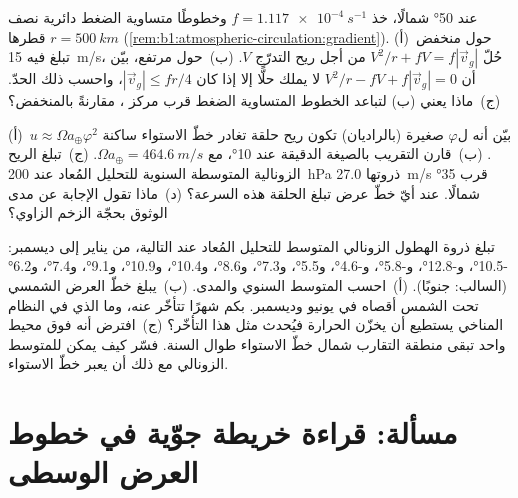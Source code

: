 \begin{exercise}[$\star\star\star$]\label{exo:b1:atmospheric-circulation:10}
عند \ang{50} شمالًا، خذ $f = \qty{1.117e-4}{s^{-1}}$ وخطوطًا متساوية الضغط دائرية نصف قطرها $r = \qty{500}{km}$ (\cref{rem:b1:atmospheric-circulation:gradient}). (أ)~حول منخفض تبلغ فيه  \qty{15}{m/s}، حُلّ $V^2/r + fV =
f|\vec v_g|$ من أجل ريح التدرّج $V$. (ب)~حول مرتفع، بيّن أن $V^2/r - fV + f
|\vec v_g| = 0$ لا يملك حلًّا إلا إذا كان $|\vec v_g| \leq fr/4$، واحسب ذلك الحدّ. (ج)~ماذا يعني (ب) لتباعد الخطوط المتساوية الضغط قرب مركز ، مقارنةً بالمنخفض؟
\end{exercise}

\begin{exercise}[$\star\star\star$]\label{exo:b1:atmospheric-circulation:11}
(أ)~بيّن أنه ل$\varphi$ صغيرة (بالراديان) تكون ريح حلقة تغادر خطّ الاستواء ساكنة $u \approx \Omega a_\oplus\varphi^2$. (ب)~قارن التقريب بالصيغة الدقيقة عند \ang{10}، مع $\Omega a_\oplus = \qty{464.6}{m/s}$. (ج)~تبلغ الريح الزونالية المتوسطة السنوية للتحليل المُعاد عند \qty{200}{hPa} ذروتها \qty{27.0}{m/s} قرب \ang{35} شمالًا. عند أيّ خطّ عرض تبلغ الحلقة هذه السرعة؟ (د)~ماذا تقول الإجابة عن مدى الوثوق بحجّة الزخم الزاوي؟
\end{exercise}

\begin{exercise}[$\star\star\star$]\label{exo:b1:atmospheric-circulation:12}
تبلغ ذروة الهطول الزونالي المتوسط للتحليل المُعاد عند  التالية، من يناير إلى ديسمبر: \ang{-10.5}، و\ang{-12.8}، و\ang{-5.8}، و\ang{-4.6}، و\ang{5.5}، و\ang{7.3}، و\ang{8.6}، و\ang{10.4}، و\ang{10.9}، و\ang{9.1}، و\ang{7.4}، و\ang{6.2}
(السالب: جنوبًا). (أ)~احسب المتوسط السنوي والمدى. (ب)~يبلغ خطّ العرض الشمسي تحت الشمس أقصاه في يونيو وديسمبر. بكم شهرًا تتأخّر  عنه، وما الذي في النظام المناخي يستطيع أن يخزّن الحرارة فيُحدث مثل هذا التأخّر؟ (ج)~افترض أنه فوق محيط واحد تبقى منطقة التقارب شمال خطّ الاستواء طوال السنة. فسّر كيف يمكن للمتوسط الزونالي مع ذلك أن يعبر خطّ الاستواء.
\end{exercise}

\section{مسألة: قراءة خريطة جوّية في خطوط العرض الوسطى}

